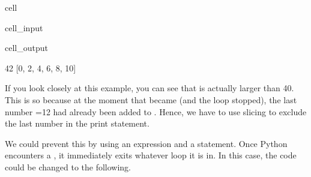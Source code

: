 \documentclass[letterpaper,10pt,english]{jupyterBook}
\begin{document}
\begin{sphinxuseclass}{cell}\begin{sphinxVerbatimInput}

\begin{sphinxuseclass}{cell_input}
\begin{sphinxVerbatim}[commandchars=\\\{\}]
  
  
  \PYG{p}{[}\PYG{p}{]}


   
      
      

\PYG{p}{[}\PYG{p}{]}
\end{sphinxVerbatim}

\end{sphinxuseclass}\end{sphinxVerbatimInput}
\begin{sphinxVerbatimOutput}

\begin{sphinxuseclass}{cell_output}
\begin{sphinxVerbatim}[commandchars=\\\{\}]
42
[0, 2, 4, 6, 8, 10]
\end{sphinxVerbatim}

\end{sphinxuseclass}\end{sphinxVerbatimOutput}

\end{sphinxuseclass}
\sphinxAtStartPar
If you look closely at this example, you can see that  is actually larger than 40. This is so because at the moment that  became  (and the loop stopped), the last number =12 had already been added to . Hence, we have to use slicing to exclude the last number in the print statement.

\sphinxAtStartPar
We could prevent this by using an  expression and a  statement. Once Python encounters a , it immediately exits whatever loop it is in. In this case, the code could be changed to the following.
\end{document}
